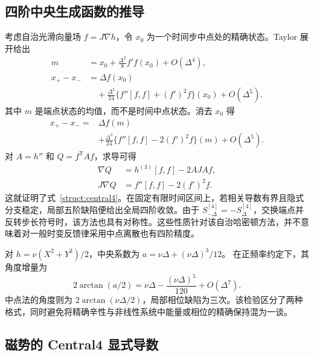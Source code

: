 \subsection{四阶中央生成函数的推导}
\label{ss:central4}

考虑自治光滑向量场 $f=J\nabla h$，令 $x_0$ 为一个时间步中点处的精确状态。Taylor 展开给出
\begin{equation}\label{ss:central-taylor}
\begin{aligned}
 m&=x_0+\tfrac{\Delta^2}{8}f'f(x_0)+O(\Delta^4),\\
 x_+-x_-&=\Delta f(x_0)\\
   &\quad+\tfrac{\Delta^3}{24}
         \{f''[f,f]+(f')^2f\}(x_0)+O(\Delta^5).
\end{aligned}
\end{equation}
其中 $m$ 是端点状态的均值，而不是时间中点状态。消去 $x_0$ 得
\begin{equation}\label{ss:central-correction}
\begin{aligned}
 x_+-x_-={}&\Delta f(m)\\
 &+\tfrac{\Delta^3}{24}\{f''[f,f]-2(f')^2f\}(m)+O(\Delta^5).
\end{aligned}
\end{equation}
对 $A=h''$ 和 $Q=f^{\mathsf T}Af$，求导可得
\[
\begin{aligned}
 \nabla Q&=h^{(3)}[f,f]-2AJA f,\\
 J\nabla Q&=f''[f,f]-2(f')^2f.
\end{aligned}
\]
这就证明了式~\eqref{struct:central4}。在固定有限时间区间上，若相关导数有界且隐式分支稳定，局部五阶缺陷便给出全局四阶收敛。由于 $S_{-\Delta}^{[4]}=-S_\Delta^{[4]}$，交换端点并反转步长符号时，该方法也具有对称性。这些性质针对该自治哈密顿方法，并不意味着对一般时变反馈律采用中点离散也有四阶精度。

对 $h=\nu(X^2+Y^2)/2$，中央系数为
$a=\nu\Delta+(\nu\Delta)^3/12$。
在正频率约定下，其角度增量为
\begin{equation}\label{ss:harmonic-phase}
 2\arctan(a/2)=\nu\Delta-\frac{(\nu\Delta)^5}{120}+O(\Delta^7).
\end{equation}
中点法的角度则为 $2\arctan(\nu\Delta/2)$，局部相位缺陷为三次。该检验区分了两种格式，同时避免将精确辛性与非线性系统中能量或相位的精确保持混为一谈。

\subsection{磁势的 Central4 显式导数}
\label{ss:central4-magnetic-section}

